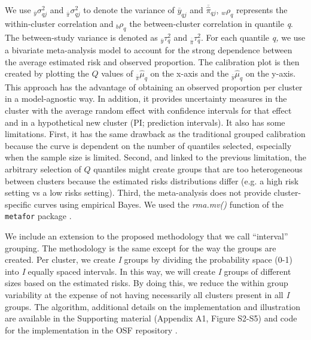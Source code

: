 We use \({}_{\overline{y}}\sigma_{qj}^{2}\) and \({}_{\overline{\widehat{\pi}}}\sigma_{qj}^{2}\) to denote the variance of \({\overline{y}}_{qj}\) and \({\overline{\widehat{\pi}}}_{qj}\), \({}_{w}\rho_{q}\) represents the within-cluster correlation and \({}_{b}\rho_{q}\) the between-cluster correlation in quantile \emph{q}. The between-study variance is denoted as \({}_{\overline{y}}\tau_{q}^{2}\) and \({}_{\overline{\widehat{\pi}}}\tau_{q}^{2}\). For each quantile \emph{q,} we use a bivariate meta-analysis model to account for the strong dependence between the average estimated risk and observed proportion. The calibration plot is then created by plotting the \(Q\) values of \({}_{\overline{\widehat{\pi}}}\hat{\mu}_{q}\) on the x-axis and the \({}_{\overline{y}}\hat{\mu}_{q}\) on the y-axis. This approach has the advantage of obtaining an observed proportion per cluster in a model-agnostic way. In addition, it provides uncertainty measures in the cluster with the average random effect with confidence intervals for that effect and in a hypothetical new cluster (\gls{PI}; prediction intervals). It also has some limitations. First, it has the same drawback as the traditional grouped calibration because the curve is dependent on the number of quantiles selected, especially when the sample size is limited. Second, and linked to the previous limitation, the arbitrary selection of \(Q\) quantiles might create groups that are too heterogeneous between clusters because the estimated risks distributions differ (e.g. a high risk setting vs a low risks setting). Third, the meta-analysis does not provide cluster-specific curves using empirical Bayes. We used the \textit{rma.mv()} function of the \texttt{metafor} package \cite{viechtbauerConductingMetaanalysesMetafor2010a}.

We include an extension to the proposed methodology that we call ``interval'' grouping. The methodology is the same except for the way the groups are created. Per cluster, we create \emph{I} groups by dividing the probability space (0-1) into \emph{I} equally spaced intervals\emph{.} In this way, we will create \emph{I} groups of different sizes based on the estimated risks. By doing this, we reduce the within group variability at the expense of not having necessarily all clusters present in all \emph{I} groups. The algorithm, additional details on the implementation and illustration are available in the Supporting material (Appendix A1, Figure S2-S5) and code for the implementation in the \gls{OSF} repository \cite{barrenadaOSFClusteredFlexible2024}. 

